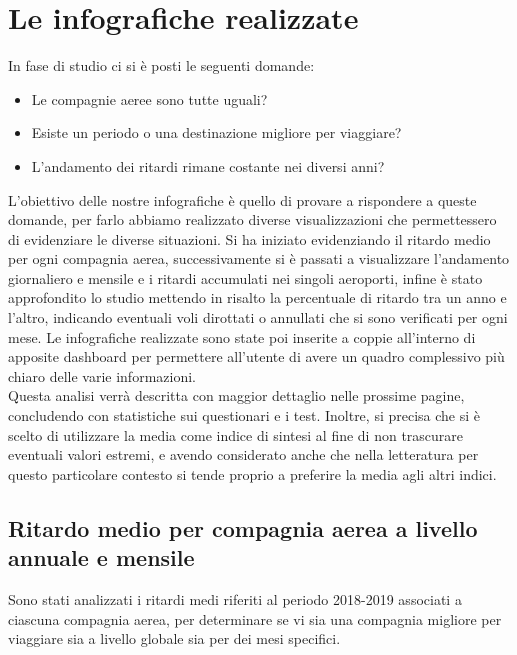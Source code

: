 \documentclass[12pt]{article}
\begin{document}
\section{Le infografiche realizzate}
In fase di studio ci si è posti le seguenti domande:
\begin{itemize}
    \item Le compagnie aeree sono tutte uguali?
    \item Esiste un periodo o una destinazione migliore per viaggiare?
    \item L'andamento dei ritardi rimane costante nei diversi anni?
\end{itemize}
L'obiettivo delle nostre infografiche è quello di provare a rispondere a queste domande, per farlo abbiamo realizzato diverse visualizzazioni che permettessero di evidenziare le diverse situazioni.
Si ha iniziato evidenziando il ritardo medio per ogni compagnia aerea, successivamente si è passati a visualizzare l'andamento giornaliero e mensile e i ritardi accumulati nei singoli aeroporti, infine è stato approfondito lo studio mettendo in risalto la percentuale di ritardo tra un anno e l'altro, indicando eventuali voli dirottati o annullati che si sono verificati per ogni mese. Le infografiche realizzate sono state poi inserite a coppie all'interno di apposite dashboard per permettere all'utente di avere un quadro complessivo più chiaro delle varie informazioni.\\
Questa analisi verrà descritta con maggior dettaglio nelle prossime pagine, concludendo con statistiche sui questionari e i test.
Inoltre, si precisa che si è scelto di utilizzare la media come indice di sintesi al fine di non trascurare eventuali valori estremi, e avendo considerato anche che nella letteratura per questo particolare contesto si tende proprio a preferire la media agli altri indici.

\subsection{Ritardo medio per compagnia aerea a livello annuale e mensile}
Sono stati analizzati i ritardi medi riferiti al periodo 2018-2019 associati a ciascuna compagnia aerea, per determinare se vi sia una compagnia migliore per viaggiare sia a livello globale sia per dei mesi specifici. 
\end{document}
